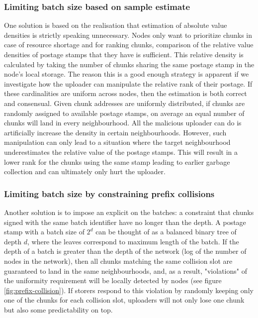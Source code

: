 \subsubsection{Limiting batch size based on sample estimate}
One solution is based on the realisation that estimation of absolute value densities is strictly speaking unnecessary. Nodes only want to prioritize chunks in case of resource shortage and for ranking chunks, comparison of the relative value densities of postage stamps that they have is sufficient.  This relative density is calculated by taking the number of chunks sharing the same postage stamp in the node's local storage. The reason this is a good enough strategy is apparent if we investigate how the uploader can manipulate the relative rank of their postage. If these cardinalities are uniform across nodes, then the estimation is both correct and consensual. Given chunk addresses are uniformly distributed, if chunks are randomly assigned to available postage stamps, on average an equal number of chunks will land in every neighbourhood. All the malicious uploader can do is artificially increase the density in certain neighbourhoods. However, such  manipulation can only lead to a situation where the target neighbourhood underestimates the relative value of the postage stamps. This will result in a lower rank for the chunks using the same stamp leading to earlier garbage collection and can ultimately only  hurt the uploader.

\subsubsection{Limiting batch size by constraining prefix collisions}

Another solution is to impose an explicit  on the batches: a constraint that chunks signed with the same batch identifier have no  longer than the depth. A postage stamp with a batch size of $2^d$ can be thought of as a balanced binary tree of depth $d$, where the leaves correspond to maximum length  of the batch. If the depth of a batch is greater than the depth of the network (log of the number of nodes in the network), then all chunks matching the same collision slot are guaranteed to land in the same neighbourhoods, and, as a result, "violations" of the uniformity requirement will be locally detected by nodes (see figure \ref{fig:prefix-collision}). If storers respond to this violation by randomly keeping only one of the chunks for each collision slot, uploaders will not only lose one chunk but also some predictability on top.

